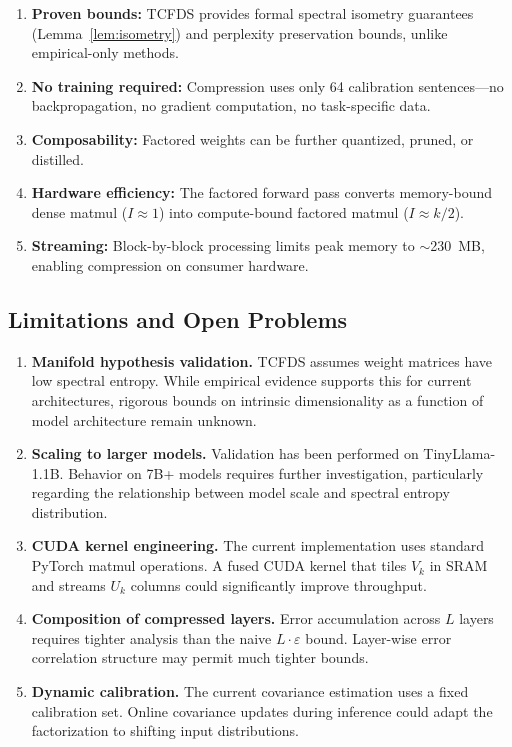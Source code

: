 \documentclass[11pt,a4paper]{article}
\begin{document}
\begin{enumerate}
    \item \textbf{Proven bounds:} TCFDS provides formal spectral isometry guarantees (Lemma~\ref{lem:isometry}) and perplexity preservation bounds, unlike empirical-only methods.
    \item \textbf{No training required:} Compression uses only 64 calibration sentences---no backpropagation, no gradient computation, no task-specific data.
    \item \textbf{Composability:} Factored weights can be further quantized, pruned, or distilled.
    \item \textbf{Hardware efficiency:} The factored forward pass converts memory-bound dense matmul ($I \approx 1$) into compute-bound factored matmul ($I \approx k/2$).
    \item \textbf{Streaming:} Block-by-block processing limits peak memory to $\sim$230~MB, enabling compression on consumer hardware.
\end{enumerate}

\subsection{Limitations and Open Problems}

\begin{enumerate}
    \item \textbf{Manifold hypothesis validation.} TCFDS assumes weight matrices have low spectral entropy. While empirical evidence supports this for current architectures, rigorous bounds on intrinsic dimensionality as a function of model architecture remain unknown.

    \item \textbf{Scaling to larger models.} Validation has been performed on TinyLlama-1.1B. Behavior on 7B+ models requires further investigation, particularly regarding the relationship between model scale and spectral entropy distribution.

    \item \textbf{CUDA kernel engineering.} The current implementation uses standard PyTorch matmul operations. A fused CUDA kernel that tiles $V_k$ in SRAM and streams $U_k$ columns could significantly improve throughput.

    \item \textbf{Composition of compressed layers.} Error accumulation across $L$ layers requires tighter analysis than the naive $L \cdot \varepsilon$ bound. Layer-wise error correlation structure may permit much tighter bounds.

    \item \textbf{Dynamic calibration.} The current covariance estimation uses a fixed calibration set. Online covariance updates during inference could adapt the factorization to shifting input distributions.
\end{enumerate}
\end{document}
